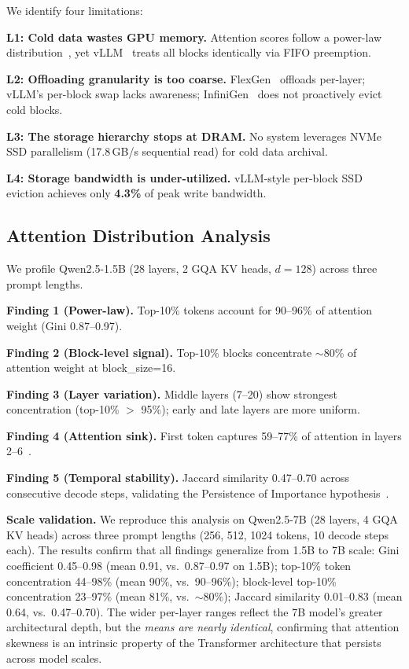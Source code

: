\documentclass[conference]{IEEEtran}
\begin{document}
We identify four limitations:

\textbf{L1: Cold data wastes GPU memory.} Attention scores follow a power-law distribution~\cite{h2o,scissorhands}, yet vLLM~\cite{vllm} treats all blocks identically via FIFO preemption.

\textbf{L2: Offloading granularity is too coarse.} FlexGen~\cite{flexgen} offloads per-layer; vLLM's per-block swap lacks awareness; InfiniGen~\cite{infinigen} does not proactively evict cold blocks.

\textbf{L3: The storage hierarchy stops at DRAM.} No system leverages NVMe SSD parallelism (17.8\,GB/s sequential read) for cold data archival.

\textbf{L4: Storage bandwidth is under-utilized.} vLLM-style per-block SSD eviction achieves only \textbf{4.3\%} of peak write bandwidth.

\subsection{Attention Distribution Analysis}

We profile Qwen2.5-1.5B (28 layers, 2 GQA KV heads, $d{=}128$) across three prompt lengths.


\textbf{Finding 1 (Power-law).} Top-10\% tokens account for 90--96\% of attention weight (Gini 0.87--0.97).

\textbf{Finding 2 (Block-level signal).} Top-10\% blocks concentrate ${\sim}$80\% of attention weight at block\_size=16.

\textbf{Finding 3 (Layer variation).} Middle layers (7--20) show strongest concentration (top-10\% $>$ 95\%); early and late layers are more uniform.

\textbf{Finding 4 (Attention sink).} First token captures 59--77\% of attention in layers 2--6~\cite{streamingllm}.

\textbf{Finding 5 (Temporal stability).} Jaccard similarity 0.47--0.70 across consecutive decode steps, validating the Persistence of Importance hypothesis~\cite{scissorhands}.

\textbf{Scale validation.} We reproduce this analysis on Qwen2.5-7B (28 layers, 4 GQA KV heads) across three prompt lengths (256, 512, 1024 tokens, 10 decode steps each). The results confirm that all findings generalize from 1.5B to 7B scale: Gini coefficient 0.45--0.98 (mean 0.91, vs.\ 0.87--0.97 on 1.5B); top-10\% token concentration 44--98\% (mean 90\%, vs.\ 90--96\%); block-level top-10\% concentration 23--97\% (mean 81\%, vs.\ ${\sim}$80\%); Jaccard similarity 0.01--0.83 (mean 0.64, vs.\ 0.47--0.70). The wider per-layer ranges reflect the 7B model's greater architectural depth, but the \emph{means are nearly identical}, confirming that attention skewness is an intrinsic property of the Transformer architecture that persists across model scales.
\end{document}
